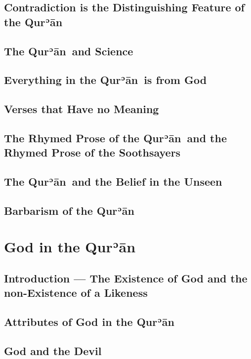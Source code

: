 \documentclass[12pt]{book}
\def \Quran{Qurʾān} %
\begin{document}
\section{Contradiction is the Distinguishing Feature of the \Quran}

\section{The \Quran\ and Science}

\section{Everything in the \Quran\ is from God}

\section{Verses that Have no Meaning}

\section{The Rhymed Prose of the \Quran\ and
the Rhymed Prose of the Soothsayers}

\section{The \Quran\ and the Belief in the Unseen}

\section{Barbarism of the \Quran}

\chapter{God in the \Quran}

\section*{Introduction — The Existence of God and
the non-Existence of a Likeness}

\section{Attributes of God in the \Quran}

\section{God and the Devil}
\end{document}
